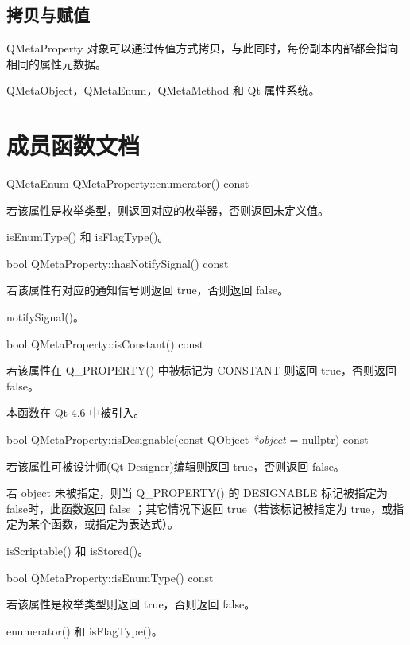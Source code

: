 \subsection{拷贝与赋值}

QMetaProperty 对象可以通过传值方式拷贝，与此同时，每份副本内部都会指向相同的属性元数据。

\begin{seeAlso}
QMetaObject，QMetaEnum，QMetaMethod 和 Qt 属性系统。
\end{seeAlso}

\section{成员函数文档}

QMetaEnum QMetaProperty::enumerator() const

若该属性是枚举类型，则返回对应的枚举器，否则返回未定义值。

\begin{seeAlso}
isEnumType() 和 isFlagType()。
\end{seeAlso}

bool QMetaProperty::hasNotifySignal() const

若该属性有对应的通知信号则返回 true，否则返回 false。

\begin{seeAlso}
notifySignal()。
\end{seeAlso}

bool QMetaProperty::isConstant() const

若该属性在 Q\_PROPERTY() 中被标记为 CONSTANT 则返回 true，否则返回 false。

本函数在 Qt 4.6 中被引入。

bool QMetaProperty::isDesignable(const QObject \emph{*object} = nullptr) const

若该属性可被设计师(Qt Designer)编辑则返回 true，否则返回 false。

若 object 未被指定，则当 Q\_PROPERTY() 的 DESIGNABLE 标记被指定为 false时，此函数返回 false ；其它情况下返回 true（若该标记被指定为 true，或指定为某个函数，或指定为表达式）。

\begin{seeAlso}
isScriptable() 和 isStored()。
\end{seeAlso}

bool QMetaProperty::isEnumType() const

若该属性是枚举类型则返回 true，否则返回 false。

\begin{seeAlso}
enumerator() 和 isFlagType()。
\end{seeAlso}

